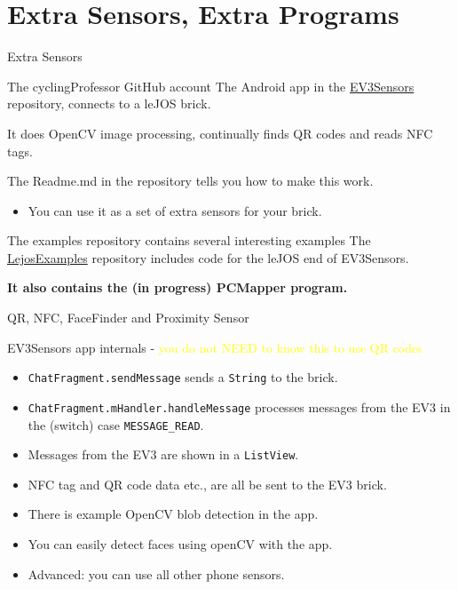 \documentclass[color=pdftex,usenames,dvipsnames, aspectratio=169]{beamer}
\begin{document}
\section*{Extra Sensors, Extra Programs}
\begin{frame}{Extra Sensors}
\begin{block}{The cyclingProfessor GitHub  account}
The Android app in the \href{https://github.com/cyclingProfessor/EV3Sensors}{EV3Sensors} repository, connects to a leJOS brick.

  It does \alert{OpenCV image processing}, \alert{continually finds QR codes} and \alert{reads NFC tags}.

The Readme.md in the repository tells you how to make this work.
\begin{itemize}
  \item You can use it as a set of extra sensors for your brick.
\end{itemize}
\end{block}

\begin{block}{The examples repository contains several interesting examples}
The \href{https://github.com/cyclingProfessor/LejosExamples}{LejosExamples} repository includes code for the leJOS end of EV3Sensors.  

\textbf{\textcolor{OliveGreen}{It also contains the (in progress) PCMapper program.}}
\end{block}
\end{frame}

\begin{frame}{QR, NFC, FaceFinder and Proximity Sensor}
\begin{block}{EV3Sensors app internals - \textcolor{yellow}{you do not NEED to know this to use QR codes}}
\begin{itemize}
\item  \lstinline!ChatFragment.sendMessage! sends a \lstinline!String! to the brick.
\item 
\lstinline!ChatFragment.mHandler.handleMessage! processes messages from the EV3 in the (switch) case \lstinline!MESSAGE_READ!.  
\item Messages from the EV3 are shown in a \lstinline!ListView!.
\item NFC tag and QR code data etc.,  are all be sent to the EV3 brick.
\item There is example OpenCV blob detection in the app.  
\item You can easily detect faces using openCV with the app.
\item Advanced: you can use all other phone sensors.
\end{itemize}
\end{block}
\end{frame}
\end{document}

